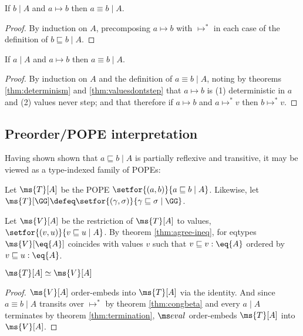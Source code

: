 \documentclass{article}
\newcommand{\ale}{\sqsubseteq}
\newcommand{\aeq}{\equiv}
\newcommand{\ordeq}{\simeq}
\newcommand{\step}{\mapsto}
\newcommand{\steps}{\step^*}
\newcommand{\lr}[2]{#2\mathrel{|}#1}
\newcommand{\lrof}[1]{\ms{T}[#1]}
\newcommand{\Val}[1]{\ms{V}[#1]}
\begin{document}
\begin{lemma}
  If $\lr{A}{b}$ and $a \step b$ then $\lr{A}{a \aeq b}$.
\end{lemma}

\begin{proof}
  By induction on $A$, precomposing $a \step b$ with $\steps$ in each case of
  the definition of $\lr{A}{b \ale b}$.
\end{proof}

\begin{lemma}
  If $\lr{A}{a}$ and $a \step b$ then $\lr{A}{a \aeq b}$.
\end{lemma}

\begin{proof}
  By induction on $A$ and the definition of $\lr{A}{a \aeq b}$, noting by
  theorems \ref{thm:determinism} and \ref{thm:valuesdontstep} that $a \step b$
  is (1) deterministic in $a$ and (2) values never step; and that therefore if
  $a \step b$ and $a \steps v$ then $b \steps v$.
\end{proof}


\subsection{Preorder/POPE interpretation}

Having shown shown that $\lr{A}{a \ale b}$ is partially reflexive and
transitive, it may be viewed as a type-indexed family of POPEs:

\begin{definition}
  Let $\lrof{A}$ be the POPE $\setfor{(a,b)}{\lr{A}{a \ale b}}$. Likewise, let
  $\lrof{\GG} \defeq \setfor{(\gamma,\sigma)}{\lr{\GG}{\gamma \ale \sigma}}$.
\end{definition}

\begin{definition}
  Let $\Val{A}$ be the restriction of $\lrof{A}$ to values,
  $\setfor{(v,u)}{\lr{A}{v \ale u}}$. By theorem \ref{thm:agree-ineq}, for
  eqtypes $\Val{\eq{A}}$ coincides with values $v$ such that $v \ale v : \eq{A}$
  ordered by $v \ale u : \eq{A}$.
\end{definition}

\begin{theorem}
  $\lrof{A} \ordeq \Val{A}$
\end{theorem}
\begin{proof}
  $\Val{A}$ order-embeds into $\lrof{A}$ via the identity. And since $\lr{A}{a
    \equiv b}$ transits over $\steps$ by theorem \ref{thm:congbeta} and every
  $\lr{A}{a}$ terminates by theorem \ref{thm:termination}, $\evalfn$
  order-embeds $\lrof{A}$ into $\Val{A}$.
\end{proof}
\end{document}
